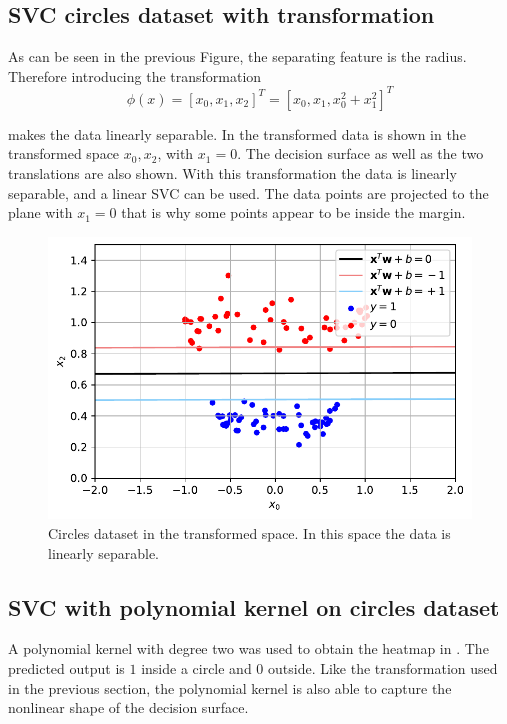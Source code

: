 \documentclass[12pt,a4paper]{scrartcl}
\begin{document}
	\subsection*{SVC circles dataset with transformation}
	As can be seen in the previous Figure, the separating feature is the radius.
	Therefore introducing the transformation
	\begin{equation}
		\phi(x) = [x_0, x_1, x_2]^T = [x_0, x_1, x_0^2+x_1^2]^T
	\end{equation}
	
	makes the data linearly separable.
	In  the transformed data is shown in the transformed space $x_0, x_2$, with $x_1=0$. The decision surface as well as the two translations are also shown. With this transformation the data is linearly separable, and a linear SVC can be used.
	The data points are projected to the plane with $x_1=0$ that is why some points appear to be inside the margin.	
	
	\begin{figure}[H]
		\centering	\includegraphics[width=0.85\linewidth]{figs/ex2_2_circ_ext.pdf}
		\caption{Circles dataset in the transformed space. In this space the data is linearly separable.}
		\label{fig:ex2_2_circles_transformed}
	\end{figure}
	
	\subsection*{SVC with polynomial kernel on circles dataset}
	A polynomial kernel with degree two was used to obtain the heatmap in .
	The predicted output is $1$ inside a circle and $0$ outside. Like the transformation used in the previous section, the polynomial kernel is also able to capture the nonlinear shape of the decision surface.
	
\end{document}
